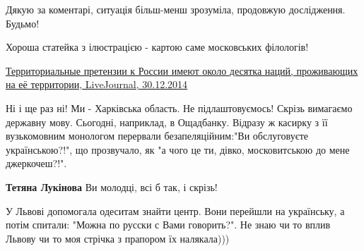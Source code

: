 \begin{itemize}
\begin{itemize}
 
Дякую за коментарі, ситуація більш-менш зрозуміла, продовжую дослідження. Будьмо!
\end{itemize}

 
Хороша статейка з ілюстрацією - картою саме московських філологів! 


\href{https://privacy-ua.livejournal.com/102513.html}{%
Территориальные претензии к России имеют около десятка наций, проживающих на её территории,%
LiveJournal, 30.12.2014
}

 

Ні і ще раз ні! Ми - Харківська область. Не підлаштовуємось! Скрізь вимагаємо
державну мову. Сьогодні, наприклад, в Ощадбанку. Відразу ж касирку з її
вузькомовним монологом перервали безапеляційним:"Ви обслуговуєте
українською?!", що прозвучало, як "а чого це ти, дівко, московитською до мене
джеркочеш?!".

\begin{itemize}
 
\textbf{Тетяна Лукінова}
Ви молодці, всі б так, і скрізь!
\end{itemize}

 

У Львові допомогала одеситам знайти центр. Вони перейшли на українську, а потім
спитали: "Можна по русски с Вами говорить?". Не знаю чи то вплив Львову чи то
моя стрічка з прапором їх налякала)))


\end{itemize}

